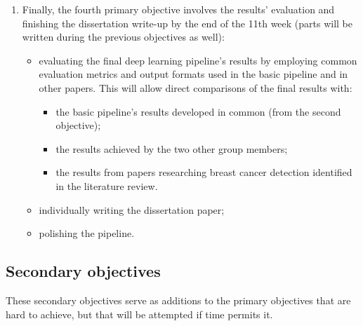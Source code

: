 \begin{enumerate}
    \item Finally, the fourth primary objective involves the results' evaluation  and finishing the dissertation write-up by the end of the 11th week (parts will be written during the previous objectives as well):
    \begin{itemize}
        \item evaluating the final deep learning pipeline's results by employing common evaluation metrics and output formats used in the basic pipeline and in other papers. This will allow direct comparisons of the final results with:
        \begin{itemize}
            \item the basic pipeline's results developed in common (from the second objective);
            \item the results achieved by the two other group members;
            \item the results from papers researching breast cancer detection identified in the literature review.
        \end{itemize}
        \item individually writing the dissertation paper;
        \item polishing the pipeline.
    \end{itemize}
\end{enumerate}

\subsection{Secondary objectives}  

These secondary objectives serve as additions to the primary objectives that are hard to achieve, but that will be attempted if time permits it.

